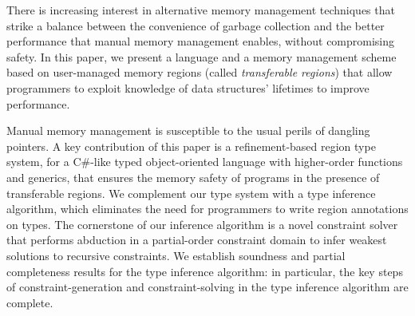 %
There is increasing interest in alternative memory management techniques
that strike a balance between the convenience of garbage collection and
the better performance that manual memory management enables, without
compromising safety.
%
In this paper, we present a language and a memory management scheme based
on user-managed memory regions (called \emph{transferable regions})
that allow programmers to exploit knowledge of data structures' lifetimes
to improve performance.

Manual memory management is susceptible to the usual perils of
dangling pointers. A key contribution of this paper is a
refinement-based region type system, for a C\#-like typed object-oriented
language with higher-order functions and generics, that ensures the
memory safety of programs in the presence of transferable regions.
We complement our type system with a type inference algorithm,
which eliminates the need for programmers to write region annotations on types.
The cornerstone of our inference algorithm is a novel constraint solver that
performs abduction in a partial-order constraint domain to infer weakest solutions
to recursive constraints.
We establish soundness and partial completeness results for the type inference algorithm:
in particular, the key steps of constraint-generation and constraint-solving
in the type inference algorithm are complete.


